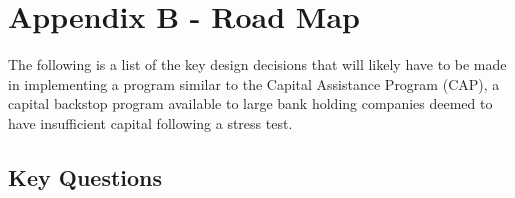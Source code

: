 \documentclass[12pt]{article}
\begin{document}
\section{Appendix B - Road Map}

The following is a list of the key design decisions that will likely have to be made in implementing a program similar to the Capital Assistance Program (CAP), a  capital backstop program available to large bank holding companies deemed to have insufficient capital following a stress test.

\subsection{Key Questions}

\begin{outline}[enumerate]


\end{outline}
\end{document}
